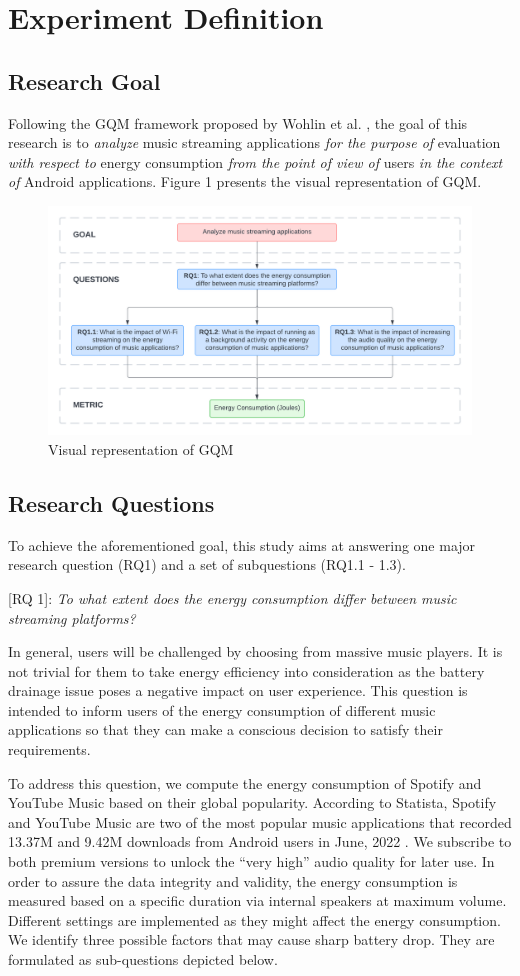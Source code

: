 \section{Experiment Definition}
\subsection{Research Goal}
Following the GQM framework proposed by Wohlin et al. \cite{wohlin2012experimentation}, the goal of this research is to \emph{analyze} music streaming applications \emph{for the purpose of} evaluation \emph{with respect to} energy consumption \emph{from the point of view of} users \emph{in the context of} Android applications. Figure 1 presents the visual representation of GQM. 
\begin{figure}[htbp]
 \centering
 \includegraphics[width=0.8\linewidth]{figures/GQM.png}\textcolor{blue}{\caption{Visual representation of GQM}}
\end{figure}
\subsection{Research Questions}
To achieve the aforementioned goal, this study aims at answering one major research question (RQ1) and a set of subquestions (RQ1.1 - 1.3).

[RQ 1]: \emph{To what extent does the energy consumption differ between music streaming platforms?}

In general, users will be challenged by choosing from massive music players. It is not trivial for them to take energy efficiency into consideration as the battery drainage issue poses a negative impact on user experience. This question is intended to inform users of the energy consumption of different music applications so that they can make a conscious decision to satisfy their requirements. 

To address this question, we compute the energy consumption of Spotify and YouTube Music based on their global popularity. According to Statista, Spotify and YouTube Music are two of the most popular music applications that recorded 13.37M and 9.42M downloads from Android users in June, 2022 \cite{13}. We subscribe to both premium versions to unlock the “very high” audio quality for later use. In order to assure the data integrity and validity, the energy consumption is measured based on a specific duration via internal speakers at maximum volume. Different settings are implemented as they might affect the energy consumption. We identify three possible factors that may cause sharp battery drop. They are formulated as sub-questions depicted below.  

